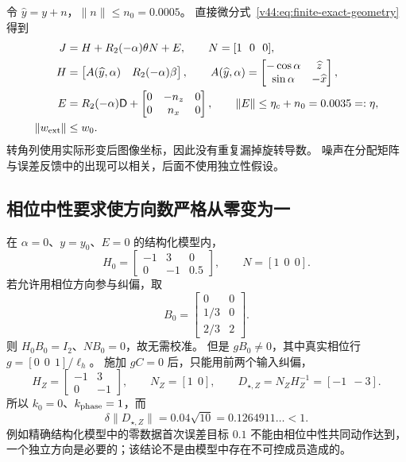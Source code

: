 \documentclass[11pt,a4paper]{article}
\numberwithin{equation}{section}
\theoremstyle{definition}
\begin{document}
令 $\widehat y=y+n$，$\|n\|\le n_0=0.0005$。
直接微分式~\eqref{v44:eq:finite-exact-geometry}得到
\begin{align}
 J&=H+R_2(-\alpha)\theta N+E,
 \qquad N=[1\ \ 0\ \ 0],\\
 H&=\begin{bmatrix}A(\widehat y,\alpha)&R_2(-\alpha)\beta\end{bmatrix},
 \qquad
 A(\widehat y,\alpha)=
 \begin{bmatrix}-\cos\alpha&\widehat z\\
                 \sin\alpha&-\widehat x\end{bmatrix},\\
 E&=R_2(-\alpha)\mathsf D+
 \begin{bmatrix}0&-n_z&0\\0&n_x&0\end{bmatrix},
 \qquad \|E\|\le\eta_c+n_0=0.0035=:\eta,
 \label{v44:eq:finite-model-factorization}\\
 \|w_{\rm ext}\|&\le w_0.
\end{align}
转角列使用实际形变后图像坐标，因此没有重复漏掉旋转导数。
噪声在分配矩阵与误差反馈中的出现可以相关，后面不使用独立性假设。

\subsection{相位中性要求使方向数严格从零变为一}
在 $\alpha=0$、$y=y_0$、$E=0$ 的结构化模型内，
\begin{equation}
 H_0=\begin{bmatrix}-1&3&0\\0&-1&0.5\end{bmatrix},
 \qquad N=[1\ \ 0\ \ 0].
\end{equation}
若允许用相位方向参与纠偏，取
\begin{equation}
 B_0=\begin{bmatrix}0&0\\1/3&0\\2/3&2\end{bmatrix}.
\end{equation}
则 $H_0B_0=I_2$、$NB_0=0$，故无需校准。
但是 $gB_0\ne0$，其中真实相位行 $g=[0\ \ 0\ \ 1]/\ell_h$。
施加 $gC=0$ 后，只能用前两个输入纠偏，
\begin{equation}
 H_Z=\begin{bmatrix}-1&3\\0&-1\end{bmatrix},\qquad
 N_Z=[1\ \ 0],\qquad
 D_{\star,Z}=N_ZH_Z^{-1}=[-1\ \ -3].
 \label{v44:eq:geometry-rank-cost}
\end{equation}
所以 $k_0=0$、$k_{\rm phase}=1$，而
\begin{equation}
 \delta\|D_{\star,Z}\|=0.04\sqrt{10}
 =0.1264911\ldots<1.
\end{equation}
例如精确结构化模型中的零数据首次误差目标 $0.1$ 不能由相位中性共同动作达到，
一个独立方向是必要的；该结论不是由模型中存在不可控成员造成的。
\end{document}
